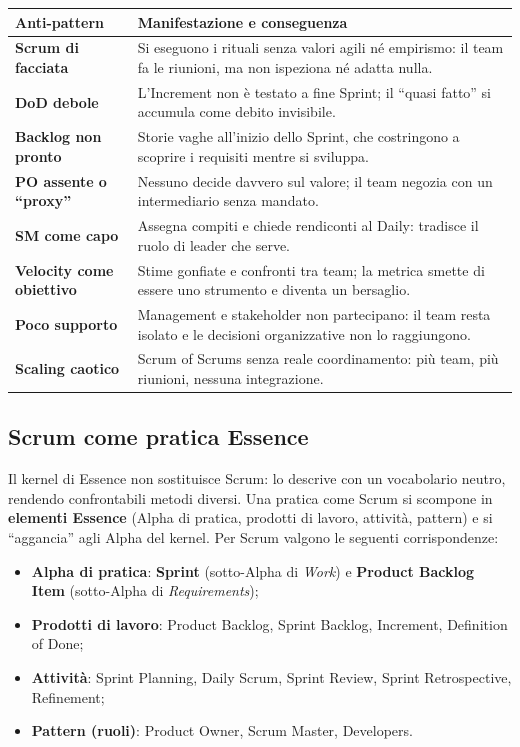 \documentclass[12pt]{extarticle}
\begin{document}
\begin{center}
\small
\begin{tabular}{p{4.0cm}p{11.0cm}}
    \toprule
    \textbf{Anti-pattern} & \textbf{Manifestazione e conseguenza} \\
    \midrule
    \textbf{Scrum di facciata} & Si eseguono i rituali senza valori agili né empirismo: il team fa le riunioni, ma non ispeziona né adatta nulla. \\
    \addlinespace
    \textbf{DoD debole} & L'Increment non è testato a fine Sprint; il ``quasi fatto'' si accumula come debito invisibile. \\
    \addlinespace
    \textbf{Backlog non pronto} & Storie vaghe all'inizio dello Sprint, che costringono a scoprire i requisiti mentre si sviluppa. \\
    \addlinespace
    \textbf{PO assente o ``proxy''} & Nessuno decide davvero sul valore; il team negozia con un intermediario senza mandato. \\
    \addlinespace
    \textbf{SM come capo} & Assegna compiti e chiede rendiconti al Daily: tradisce il ruolo di leader che serve. \\
    \addlinespace
    \textbf{Velocity come obiettivo} & Stime gonfiate e confronti tra team; la metrica smette di essere uno strumento e diventa un bersaglio. \\
    \addlinespace
    \textbf{Poco supporto} & Management e stakeholder non partecipano: il team resta isolato e le decisioni organizzative non lo raggiungono. \\
    \addlinespace
    \textbf{Scaling caotico} & Scrum of Scrums senza reale coordinamento: più team, più riunioni, nessuna integrazione. \\
    \bottomrule
\end{tabular}
\end{center}

\subsection{Scrum come pratica Essence}

\noindent Il kernel di Essence non sostituisce Scrum: lo descrive con un vocabolario neutro, rendendo confrontabili metodi diversi. Una pratica come Scrum si scompone in \textbf{elementi Essence} (Alpha di pratica, prodotti di lavoro, attività, pattern) e si ``aggancia'' agli Alpha del kernel. Per Scrum valgono le seguenti corrispondenze:
\begin{itemize}
    \item \textbf{Alpha di pratica}: \textbf{Sprint} (sotto-Alpha di \textit{Work}) e \textbf{Product Backlog Item} (sotto-Alpha di \textit{Requirements});
    \item \textbf{Prodotti di lavoro}: Product Backlog, Sprint Backlog, Increment, Definition of Done;
    \item \textbf{Attività}: Sprint Planning, Daily Scrum, Sprint Review, Sprint Retrospective, Refinement;
    \item \textbf{Pattern (ruoli)}: Product Owner, Scrum Master, Developers.
\end{itemize}
\end{document}
